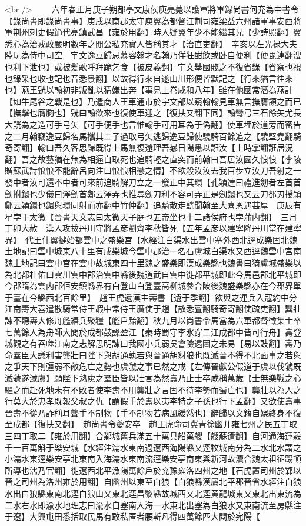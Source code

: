 <br />
　　六年春正月庚子朔都亭文康侯庾亮薨以護軍將軍錄尚書何充為中書令【錄尚書即錄尚書事】庚戌以南郡太守庾翼為都督江荆司雍梁益六州諸軍事安西將軍荆州刺史假節代亮鎮武昌【雍於用翻】時人疑翼年少不能繼其兄【少詩照翻】翼悉心為治戎政嚴明數年之閒公私充實人皆稱其才【治直吏翻】　辛亥以左光禄大夫陸玩為侍中司空　宇文逸豆歸忌慕容翰才名翰乃佯狂酣飲或卧自便利【便毘連翻溲也利下泄也】或被髪歌呼拜跪乞食【被皮義翻】宇文舉國賤之不復省錄【省察也視也錄采也收也記也音悉景翻】以故得行來自遂山川形便皆默記之【行來猶言往來也】燕王皝以翰初非叛亂以猜嫌出奔【事見上卷咸和八年】雖在他國常潛為燕計【如牛尾谷之戰是也】乃遣商人王車通市於宇文部以窺翰翰見車無言撫膺頷之而已【撫擊也膺胸也】皝曰翰欲來也復使車迎之【復扶又翻下同】翰彎弓三石餘矢尤長大皝為之造可手弓矢【可手便手也言惟翰手可用耳為于偽翻】使車埋於道旁而密告之二月翰竊逸豆歸名馬攜其二子過取弓矢逃歸逸豆歸使驍騎百餘追之【驍堅堯翻騎奇寄翻】翰曰吾久客思歸既得上馬無復還理吾曏日陽愚以誑汝【上時掌翻誑居況翻】吾之故藝猶在無為相逼自取死也追騎輕之直突而前翰曰吾居汝國久悢悢【李陵贈蘇武詩悢悢不能辭呂向注曰悢悢相戀之情】不欲殺汝汝去我百步立汝刀吾射之一發中者汝可還不中者可來前追騎解刀立之一發正中其環【孔穎達曰禮進劎者左首首劒拊鐶也少儀曰澤劒首鄭云澤弄也推尋劒刀利不容可弄正是劒鐶也又云刀郤刃授頴鄭云穎鐶也鐶與環同射而亦翻中竹仲翻】追騎散走皝聞翰至大喜恩遇甚厚　庚辰有星孛于太微【晉書天文志曰太微天子庭也五帝坐也十二諸侯府也孛蒲内翻】　三月丁卯大赦　漢人攻拔丹川守將孟彦劉齊李秋皆死【五年孟彦以建寧降丹川當在建寧界】　代王什翼犍始都雲中之盛樂宫【水經注白渠水出雲中塞外西北逕成樂固北魏土地記曰雲中城東八十里有成樂城今雲中郡治一名石盧城白渠水又西逕魏雲中宫南魏土地記曰雲中宫在雲中故城東四十里魏之盛樂即漢成樂縣也魏書曰猗盧城盛樂以為北都杜佑曰雲川雲中郡治雲中縣後魏道武自雲中徙都平城即此今馬邑郡北平城即今郡隋為雲内郡恒安鎮縣界有白登山白登臺高柳城參合陂後魏盛樂縣亦在今郡界單于臺在今縣西北百餘里】　趙王虎遺漢主壽書【遺于季翻】欲與之連兵入寇約中分江南壽大喜遣散騎常侍王嘏中常侍王廣使于趙【散悉亶翻騎奇寄翻使疏吏翻】龔壯諫不聽夀大修舟艦繕兵聚糧【艦戶黯翻】秋九月以尚書令馬當為六軍都督徵集士卒七萬餘人為舟師大閲於成都鼓譟盈江【秦時蜀守李氷穿二江成都中皆可行舟】壽登城觀之有吞噬江南之志解思明諫曰我國小兵弱吳會險遠圖之未易【易以䜴翻】壽乃命羣臣大議利害龔壯曰陛下與胡通孰若與晉通胡豺狼也既滅晉不得不北面事之若與之爭天下則彊弱不敵危亡之勢也虞虢之事已然之戒【左傳晉獻公假道于虞以伐虢既滅虢遂滅虞】願陛下熟慮之羣臣皆以壯言為然壽乃止士卒咸稱萬歲【士無樂戰之心驅之而赴死地未有不敗者使李夀不用龔壯之言固不待李勢而蜀亡也】龔壯以為人之行莫大於忠孝既報父叔之仇【謂假手於夀以夷李特之子孫也行下孟翻】又欲使壽事晉壽不從乃詐稱耳聾手不制物【手不制物若病風緩然也】辭歸以文籍自娛終身不復至成都【復扶又翻】　趙尚書令夔安卒　趙王虎命司冀青徐幽并雍七州之民五丁取三四丁取二【雍於用翻】合鄴城舊兵滿五十萬具船萬艘【艘蘇遭翻】自河通海運穀千一百萬斛于樂安城【水經注濡水東南過遼西海陽縣又逕牧城南分為二水北水謂之小濡水東逕樂安亭北東南入海濡水東南流逕樂安亭南東與新河故瀆合魏太祖征蹋頓所導也濡乃官翻】徙遼西北平漁陽萬餘戶於兖豫雍洛四州之地【石虎置司州於鄴以晉之司州為洛州雍於用翻】自幽州以東至白狼【白狼縣漢屬北平郡晉省水經注白狼水出白狼縣東南北逕白狼山又東北逕昌黎縣故城西又北逕黄龍城東又東北出東流為二水右水即渝水地理志曰渝水自塞南入海一水東北出塞為白狼水又東南流至房縣注于遼】大興屯田悉括取民馬有敢私匿者腰斬凡得四萬餘匹大閲於宛陽【